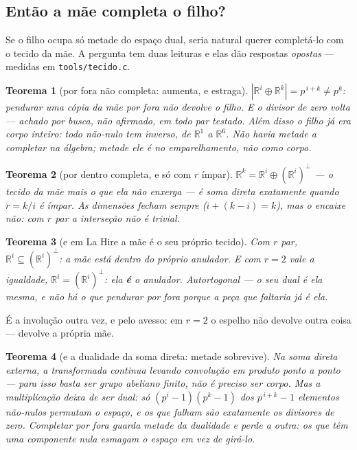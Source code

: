 \documentclass[11pt]{article}
\newcommand{\code}[1]{\texttt{\small #1}}
\newcommand{\R}{\mathbb R}
\theoremstyle{plain}
\newtheorem{teorema}{Teorema}
\theoremstyle{remark}
\begin{document}
\subsection*{Então a mãe completa o filho?}

Se o filho ocupa só metade do espaço dual, seria natural querer completá-lo com o tecido da mãe. A
pergunta tem duas leituras e elas dão respostas \emph{opostas} --- medidas em \code{tools/tecido.c}.

\begin{teorema}[por fora não completa: aumenta, e estraga]
$|\R^i\oplus\R^k|=p^{\,i+k}\ne p^k$: pendurar uma cópia da mãe por fora não devolve o filho. E o
divisor de zero volta --- \emph{achado por busca}, não afirmado, em todo par testado. Além disso o
filho já era corpo inteiro: todo não-nulo tem inverso, de $\R^1$ a $\R^6$. \emph{Não havia metade a
completar na álgebra}; metade ele é no emparelhamento, não como corpo.
\end{teorema}

\begin{teorema}[por dentro completa, e só com $r$ ímpar]
$\R^k=\R^i\oplus(\R^i)^{\perp}$ --- o tecido da mãe mais o que ela não enxerga --- é soma direta
\emph{exatamente} quando $r=k/i$ é ímpar. As dimensões fecham sempre ($i+(k-i)=k$), mas o encaixe
não: com $r$ par a interseção não é trivial.
\end{teorema}

\begin{teorema}[e em La Hire a mãe é o seu próprio tecido]
Com $r$ par, $\R^i\subseteq(\R^i)^{\perp}$: a mãe está dentro do próprio anulador. E com $r=2$ vale a
igualdade, $\R^i=(\R^i)^{\perp}$: ela \textbf{é} o anulador. Autortogonal --- o seu dual é ela mesma,
e não há o que pendurar por fora porque a peça que faltaria já é ela.
\end{teorema}

\noindent É a involução outra vez, e pelo avesso: em $r=2$ o espelho não devolve outra coisa ---
devolve a própria mãe.

\begin{teorema}[e a dualidade da soma direta: metade sobrevive]
Na soma direta externa, a transformada \emph{continua} levando convolução em produto ponto a ponto
--- para isso basta ser grupo abeliano finito, não é preciso ser corpo. Mas a multiplicação deixa de
ser dual: só $(p^i-1)(p^k-1)$ dos $p^{\,i+k}-1$ elementos não-nulos permutam o espaço, e os que
falham são exatamente os divisores de zero. \emph{Completar por fora guarda metade da dualidade e
perde a outra}: os que têm uma componente nula esmagam o espaço em vez de girá-lo.
\end{teorema}
\end{document}
